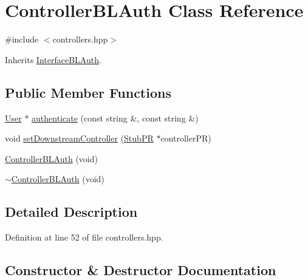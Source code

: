 \hypertarget{class_controller_b_l_auth}{}\section{Controller\+B\+L\+Auth Class Reference}
\label{class_controller_b_l_auth}


{\ttfamily \#include $<$controllers.\+hpp$>$}



Inherits \hyperlink{class_interface_b_l_auth}{Interface\+B\+L\+Auth}.

\subsection*{Public Member Functions}
\begin{DoxyCompactItemize}
\item 
\hyperlink{class_user}{User} $\ast$ \hyperlink{class_controller_b_l_auth_a0571197328b8100922cefc83a9a96987}{authenticate} (const string \&, const string \&)
\item 
void \hyperlink{class_controller_b_l_auth_ae514249d909d1449d23f1d2fe7b85eea}{set\+Downstream\+Controller} (\hyperlink{class_stub_p_r}{Stub\+PR} $\ast$controller\+PR)
\item 
\hyperlink{class_controller_b_l_auth_a0c272a835acf95216099ae010d21b0bd}{Controller\+B\+L\+Auth} (void)
\item 
\hyperlink{class_controller_b_l_auth_aa24d57c3e2cca656772d5e0f388a2d47}{$\sim$\+Controller\+B\+L\+Auth} (void)
\end{DoxyCompactItemize}


\subsection{Detailed Description}


Definition at line 52 of file controllers.\+hpp.



\subsection{Constructor \& Destructor Documentation}
\mbox{\label{class_controller_b_l_auth_a0c272a835acf95216099ae010d21b0bd}} 
